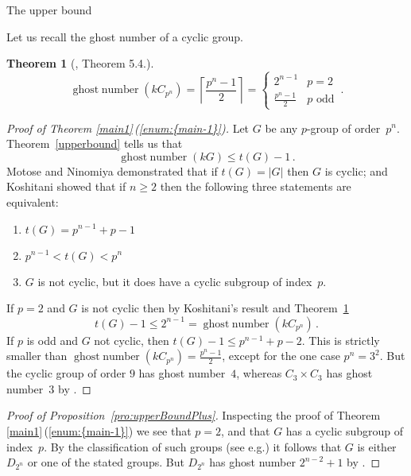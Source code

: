 \documentclass[12pt,reqno]{amsart}
\newtheorem{thm}{Theorem}[section]
\theoremstyle{definition}
\theoremstyle{remark}
\begin{document}
\begin{section}{The upper bound}

\noindent
Let us recall the ghost number of a cyclic group.

\begin{thm}[\cite{CheboluChristensenMinac:ghosts}, Theorem 5.4.]
\label{cyclic}
\[
{\operatorname{ghost\;number}}(kC_{p^n}) = \left\lceil \frac{p^n-1}{2} \right\rceil = \begin{cases} 2^{n-1} &  p=2  \\ \frac{p^n-1}{2}& \text{$p$ odd} \end{cases} \, .
\]
\end{thm}

\begin{proof}[Proof of Theorem \ref{main1}\,({\ref{enum:{main-1}}})]
Let $G$ be any $p$-group of order~$p^n$.
Theorem~\ref{upperbound} tells us that
\[
{\operatorname{ghost\;number}}(kG) \leq t(G)-1 \, .
\]
Motose and Ninomiya \cite[Thm 1]{MotoseNinomiya:nilpotencyIndex} demonstrated that if $t(G) = {\left\vert{G}\right\vert}$ then $G$ is cyclic; and Koshitani \cite[Thm 1.6]{Koshitani:nilpotencyIndices} showed that if $n \geq 2$ then the following three statements are equivalent:
\begin{enumerate}
\item $t(G) = p^{n-1}+p-1$
\item $p^{n-1} < t(G) < p^n$
\item $G$ is not cyclic, but it does have a cyclic subgroup of index~$p$. 
\end{enumerate}
If $p=2$ and $G$ is not cyclic then by Koshitani's result and Theorem~\ref{cyclic}
\[
t(G) -1 \leq 2^{n-1} = {\operatorname{ghost\;number}}(kC_{p^n}) \, .
\]
If $p$ is odd and $G$ not cyclic, then $t(G)-1 \leq p^{n-1}+p-2$. This is strictly smaller than ${\operatorname{ghost\;number}}(kC_{p^n}) = \frac{p^n-1}{2}$, except for the one case $p^n=3^2$. But the cyclic group of order $9$ has ghost number~$4$, whereas $C_3 \times C_3$ has ghost number~$3$ by \cite[Thm 1.1]{ChristensenWang:ghostNumbers}\@.
\end{proof}

\begin{proof}[Proof of Proposition~\ref{pro:upperBoundPlus}]
Inspecting the proof of Theorem \ref{main1}\,({\ref{enum:{main-1}}}) we see that $p=2$, and that $G$ has a cyclic subgroup of index~$p$. By the classification of such groups (see e.g.\@ \cite[23.4]{Aschbacher:book}) it follows that $G$ is either $D_{2^n}$ or one of the stated groups. But $D_{2^n}$ has ghost number $2^{n-2}+1$ by \cite[Cor 1.1]{ChristensenWang:ghostNumbers}\@.
\end{proof}

\end{section}
\end{document}
